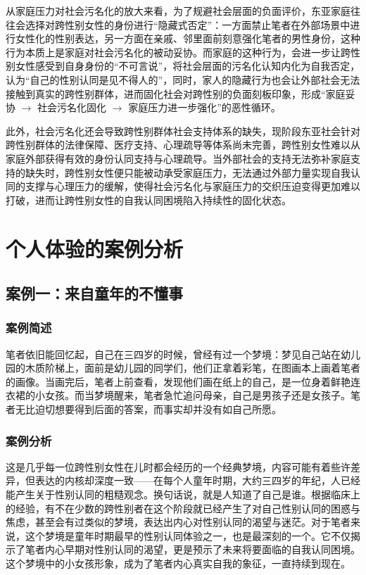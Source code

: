 \documentclass[twocolumn]{ctexart}
\begin{document}
从家庭压力对社会污名化的放大来看，为了规避社会层面的负面评价，东亚家庭往往会选择对跨性别女性的身份进行“隐藏式否定”：一方面禁止笔者在外部场景中进行女性化的性别表达，另一方面在亲戚、邻里面前刻意强化笔者的男性身份，这种行为本质上是家庭对社会污名化的被动妥协。而家庭的这种行为，会进一步让跨性别女性感受到自身身份的“不可言说”，将社会层面的污名化认知内化为自我否定，认为“自己的性别认同是见不得人的”，同时，家人的隐藏行为也会让外部社会无法接触到真实的跨性别群体，进而固化社会对跨性别的负面刻板印象，形成“家庭妥协 $\rightarrow$ 社会污名化固化 $\rightarrow$ 家庭压力进一步强化”的恶性循环。

此外，社会污名化还会导致跨性别群体社会支持体系的缺失，现阶段东亚社会针对跨性别群体的法律保障、医疗支持、心理疏导等体系尚未完善，跨性别女性难以从家庭外部获得有效的身份认同支持与心理疏导。当外部社会的支持无法弥补家庭支持的缺失时，跨性别女性便只能被动承受家庭压力，无法通过外部力量实现自我认同的支撑与心理压力的缓解，使得社会污名化与家庭压力的交织压迫变得更加难以打破，进而让跨性别女性的自我认同困境陷入持续性的固化状态。

\section {个人体验的案例分析}
\subsection {案例一：来自童年的不懂事}
\subsubsection{案例简述}
笔者依旧能回忆起，自己在三四岁的时候，曾经有过一个梦境：梦见自己站在幼儿园的木质阶梯上，面前是幼儿园的同学们，他们正拿着彩笔，在图画本上画着笔者的画像。当画完后，笔者上前查看，发现他们画在纸上的自己，是一位身着鲜艳连衣裙的小女孩。而当梦境醒来，笔者急忙追问母亲，自己是男孩子还是女孩子。笔者无比迫切想要得到后面的答案，而事实却并没有如自己所愿。

\subsubsection{案例分析}
这是几乎每一位跨性别女性在儿时都会经历的一个经典梦境，内容可能有着些许差异，但表达的内核却深度一致——在每个人童年时期，大约三四岁的年纪，人已经能产生关于性别认同的粗糙观念。换句话说，就是人知道了自己是谁。根据临床上的经验，有不在少数的跨性别者在这个阶段就已经产生了对自己性别认同的困惑与焦虑，甚至会有过类似的梦境，表达出内心对性别认同的渴望与迷茫\cite{pan2023gendertrouble}。对于笔者来说，这个梦境是童年时期最早的性别认同体验之一，也是最深刻的一个。它不仅揭示了笔者内心早期对性别认同的渴望，更是预示了未来将要面临的自我认同困境。这个梦境中的小女孩形象，成为了笔者内心真实自我的象征，一直持续到现在。
\end{document}
